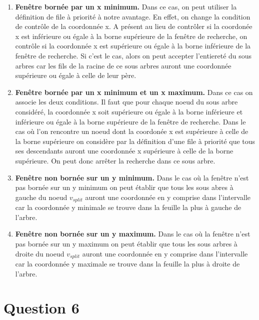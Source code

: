 \documentclass{article}
\begin{document}
    \begin{enumerate}
        \item \textbf{Fenêtre bornée par un x minimum.} Dans ce cas, on peut utiliser la définition de file à priorité à notre avantage. En effet, on change la condition de contrôle de la coordonnée x.
        A présent au lieu de contrôler si la coordonée x est inférieure ou égale à la borne supérieure de la fenêtre de recherche, on contrôle si la coordonnée x est supérieure ou égale à la borne inférieure de la fenêtre de recherche.
        Si c'est le cas, alors on peut accepter l'entiereté du sous arbres car les fils de la racine de ce sous arbres auront une coordonnée supérieure ou égale à celle de leur père.
        \item \textbf{Fenêtre bornée par un x minimum et un x maximum.} Dans ce cas on associe les deux conditions. Il faut que pour chaque noeud du sous arbre considéré, la coordonnée x soit supérieure ou égale à la borne inférieure et
        inférieure ou égale à la borne supérieure de la fenêtre de recherche. Dans le cas où l'on rencontre un noeud dont la coordonée x est supérieure à celle de la borne supérieure on considère par la définition
        d'une file à priorité que tous ses descendants auront une coordonnée x supérieure à celle de la borne supérieure. On peut donc arrêter la recherche dans ce sous arbre.
        \item \textbf{Fenêtre non bornée sur un y minimum.} Dans le cas où la fenêtre n'est pas bornée sur un y minimum on peut établir que tous les sous abres à gauche du noeud 
        $v_{split}$ auront une coordonnée en y comprise dans l'intervalle car la coordonnée y minimale se trouve dans la feuille la plus à gauche de l'arbre.
        \item \textbf{Fenêtre non bornée sur un y maximum.} Dans le cas où la fenêtre n'est pas bornée sur un y maximum on peut établir que tous les sous arbres à droite du noeud
        $v_{split}$ auront une coordonnée en y comprise dans l'intervalle car la coordonnée y maximale se trouve dans la feuille la plus à droite de l'arbre.
    \end{enumerate}

\section{Question 6}
\end{document}
